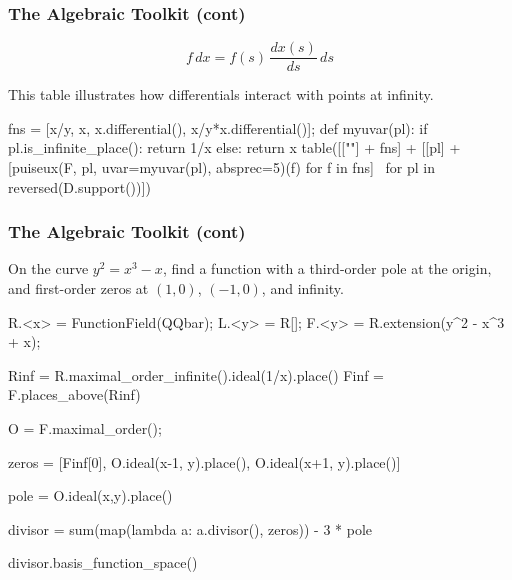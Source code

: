 \documentclass[aspectratio=169,dvipsnames]{beamer}
\begin{document}
\begin{frame}[fragile]
\frametitle{The Algebraic Toolkit (cont)}

\[ f\, dx = f(s) \, \frac{dx(s)}{ds} \, ds \]

This table illustrates how differentials interact with points at infinity.

\begin{sageblock}[ex1]
fns = [x/y, x, x.differential(), x/y*x.differential()];
def myuvar(pl):
    if pl.is_infinite_place():
        return 1/x
    else:
        return x
table([[""] + fns] + [[pl] + [puiseux(F, pl, uvar=myuvar(pl), absprec=5)(f) for f in fns] \
                      for pl in reversed(D.support())])
\end{sageblock}

\end{frame}

\begin{frame}[fragile]
\frametitle{The Algebraic Toolkit (cont)}

On the curve $y^2 = x^3 - x$, find a function with a third-order pole at the origin, and first-order zeros at $(1,0)$, $(-1,0)$, and infinity.

\begin{sageblock}[ex1]
R.<x> = FunctionField(QQbar); L.<y> = R[]; F.<y> = R.extension(y^2 - x^3 + x);

Rinf = R.maximal_order_infinite().ideal(1/x).place()
Finf = F.places_above(Rinf)

O = F.maximal_order();

zeros = [Finf[0], O.ideal(x-1, y).place(), O.ideal(x+1, y).place()]

pole = O.ideal(x,y).place()

divisor = sum(map(lambda a: a.divisor(), zeros)) - 3 * pole

divisor.basis_function_space()

\end{sageblock}

\end{frame}

\end{document}
